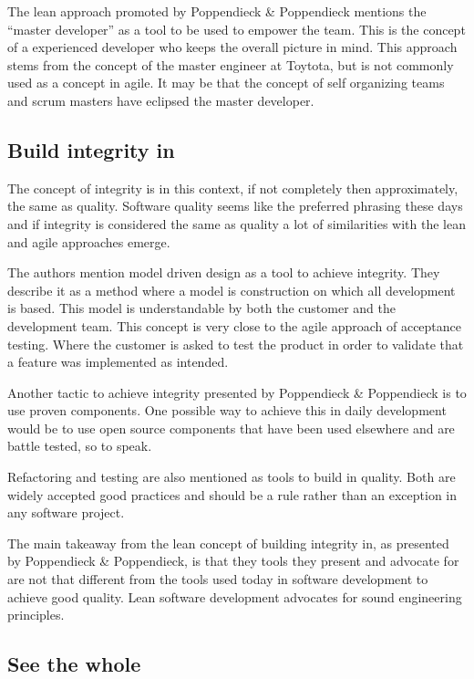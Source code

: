 The lean approach promoted by Poppendieck \& Poppendieck mentions the ``master developer'' as a tool to be used to empower the team. This is the concept of a experienced developer who keeps the overall picture in mind.\cite{poppendieck2003lean} This approach stems from the concept of the master engineer at Toytota\cite{poppendieck2003lean}, but is not commonly used as a concept in agile. It may be that the concept of self organizing teams and scrum masters have eclipsed the master developer.


\subsection{Build integrity in}

The concept of integrity is in this context, if not completely then approximately, the same as quality. Software quality seems like the preferred phrasing these days and if integrity is considered the same as quality a lot of similarities with the lean and agile approaches emerge.

The authors mention model driven design as a tool to achieve integrity. They describe it as a method where a model is construction on which all development is based. This model is understandable by both the customer and the development team.\cite{poppendieck2003lean} This concept is very close to the agile approach of acceptance testing. Where the customer is asked to test the product in order to validate that a feature was implemented as intended.

Another tactic to achieve integrity presented by Poppendieck \& Poppendieck is to use proven components.\cite{poppendieck2003lean} One possible way to achieve this in daily development would be to use open source components that have been used elsewhere and are battle tested, so to speak.

Refactoring and testing are also mentioned as tools to build in quality.\cite{poppendieck2003lean} Both are widely accepted good practices and should be a rule rather than an exception in any software project.

The main takeaway from the lean concept of building integrity in, as presented by Poppendieck \& Poppendieck, is that they tools they present and advocate for are not that different from the tools used today in software development to achieve good quality. Lean software development advocates for sound engineering principles.


\subsection{See the whole}

